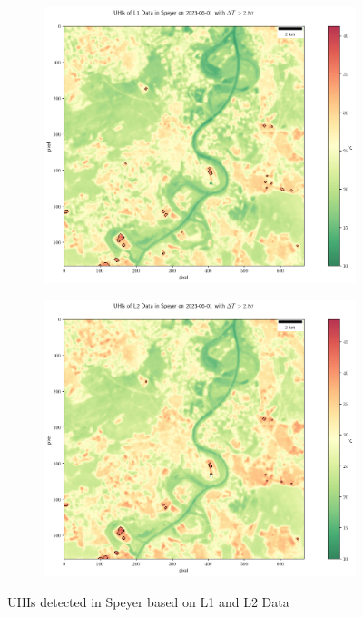 \documentclass[a4paper, english]{article}
\begin{document}
\begin{figure}[!htbp]
    \centering
    \begin{subfigure}{0.49\textwidth}
    \includegraphics[width=\textwidth]{img/UHIL1Speyer.png}
    \end{subfigure}
    \begin{subfigure}{0.49\textwidth}
    \includegraphics[width=\textwidth]{img/UHIL2Speyer.png}
    \end{subfigure}
    \caption{UHIs detected in Speyer\label{fig:UHIsSpey} based on L1 and L2 Data}
\end{figure}
\end{document}
